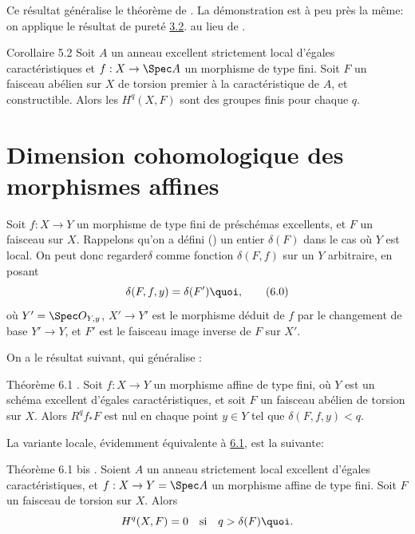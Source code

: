 \documentclass[10pt]{../fichiers-configuration-latex/smfart}
\begin{document}
Ce résultat généralise le théorème de . La démonstration est à
peu près la même: on applique le résultat de pureté
\hyperref[XIX.thm3.2]{3.2}. au lieu de 
.

\begin{enonce*}{Corollaire 5.2}
Soit $A$ un anneau excellent strictement local d'égales
caractéristiques et $f:X\rightarrow \Spec A$ un morphisme de type
fini. Soit $F$ un faisceau abélien sur $X$ de torsion premier à la
caractéristique de $A$, et constructible. Alors les $H^{q}(X,F)$ sont
des groupes finis pour chaque $q$.
\end{enonce*}

\section{Dimension cohomologique des morphismes affines}

Soit $f:X\rightarrow Y$ un morphisme de type fini de préschémas
excellents, et $F$ un faisceau sur $X$. Rappelons qu'on a défini 
() un entier $\delta(F)$ dans le cas où $Y$ est local. On peut donc
regarder\pageoriginale $\delta$ comme fonction $\delta(F,f)$ sur un $Y$
arbitraire, en posant
\begin{equation*}
\delta(F,f,y)=\delta(F'){\quoi},\tag{6.0}
\end{equation*}
où $Y'=\Spec O_{Y,y}$, $X'\rightarrow Y'$ est le morphisme déduit de
$f$ par le changement de base $Y'\rightarrow Y$, et $F'$ est le
faisceau image inverse de $F$ sur $X'$.

On a le résultat suivant, qui généralise :

\begin{enonce*}{Théorème 6.1}
\footnotemark. Soit $f:X\rightarrow Y$ un morphisme affine de type
fini, où $Y$ est un schéma excellent d'égales caractéristiques, et
soit $F$ un faisceau abélien de torsion sur $X$. Alors
$R^{q}f_{\ast}F$ est nul en chaque point $y\in Y$ tel que $\delta(F,f,y)<q$.
\end{enonce*}

La variante locale, évidemment équivalente à \hyperref[XIX.thm6.1]{6.1}, est la suivante:

\begin{enonce*}{Théorème 6.1 bis}
\footnotemark[1]. Soient $A$ un anneau strictement local excellent
d'égales caractéristiques, et $f:X\rightarrow Y=\Spec A$ un morphisme
affine de type fini. Soit $F$ un faisceau de torsion sur $X$. Alors
$$
H^{q}(X,F)=0\quad\text{\rm si}\quad q>\delta(F){\quoi}.
$$
\end{enonce*}
\end{document}
